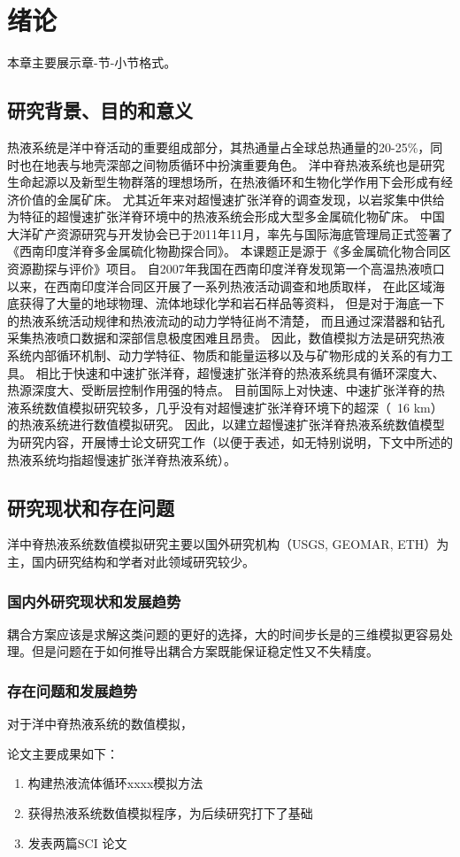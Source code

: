 
\chapter{绪论}
\label{chapter:Introduction}

本章主要展示章-节-小节格式。

\section{研究背景、目的和意义}
热液系统是洋中脊活动的重要组成部分，其热通量占全球总热通量的20-25\%，同时也在地表与地壳深部之间物质循环中扮演重要角色。
洋中脊热液系统也是研究生命起源以及新型生物群落的理想场所，在热液循环和生物化学作用下会形成有经济价值的金属矿床。
尤其近年来对超慢速扩张洋脊的调查发现，以岩浆集中供给为特征的超慢速扩张洋脊环境中的热液系统会形成大型多金属硫化物矿床。
中国大洋矿产资源研究与开发协会已于2011年11月，率先与国际海底管理局正式签署了《西南印度洋脊多金属硫化物勘探合同》。
本课题正是源于《多金属硫化物合同区资源勘探与评价》项目。
自2007年我国在西南印度洋脊发现第一个高温热液喷口以来，在西南印度洋合同区开展了一系列热液活动调查和地质取样，
在此区域海底获得了大量的地球物理、流体地球化学和岩石样品等资料，
但是对于海底一下的热液系统活动规律和热液流动的动力学特征尚不清楚，
而且通过深潜器和钻孔采集热液喷口数据和深部信息极度困难且昂贵。
因此，数值模拟方法是研究热液系统内部循环机制、动力学特征、物质和能量运移以及与矿物形成的关系的有力工具。
相比于快速和中速扩张洋脊，超慢速扩张洋脊的热液系统具有循环深度大、热源深度大、受断层控制作用强的特点。
目前国际上对快速、中速扩张洋脊的热液系统数值模拟研究较多，几乎没有对超慢速扩张洋脊环境下的超深（~16 km）的热液系统进行数值模拟研究。
因此，以建立超慢速扩张洋脊热液系统数值模型为研究内容，开展博士论文研究工作（以便于表述，如无特别说明，下文中所述的热液系统均指超慢速扩张洋脊热液系统）。


\section{研究现状和存在问题}
洋中脊热液系统数值模拟研究主要以国外研究机构（USGS, GEOMAR, ETH）为主，国内研究结构和学者对此领域研究较少。

\subsection{国内外研究现状和发展趋势}


耦合方案应该是求解这类问题的更好的选择，大的时间步长是的三维模拟更容易处理。但是问题在于如何推导出耦合方案既能保证稳定性又不失精度。

\subsection{存在问题和发展趋势}
对于洋中脊热液系统的数值模拟，


论文主要成果如下：

\begin{enumerate}
	\item 构建热液流体循环xxxx模拟方法
	\item 获得热液系统数值模拟程序，为后续研究打下了基础
	\item 发表两篇SCI 论文
\end{enumerate}


